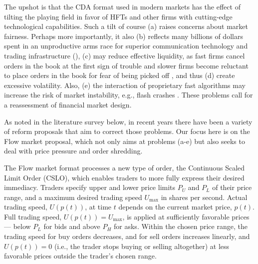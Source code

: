 The upshot is that the CDA format used in modern markets has the effect of tilting the playing field in favor of HFTs and other firms with cutting-edge technological capabilities. Such a tilt of course (a) raises concerns about market fairness. 
Perhaps more importantly, it also
(b) reflects many billions of dollars spent in an unproductive arms race for superior communication technology and trading infrastructure (\citealp{Budish2015}),
(c) may reduce effective liquidity, as fast firms cancel orders in the book at the first sign of trouble and slower firms become reluctant to place orders in the book for fear of being picked off \citep{Easly2012}, and thus
(d) create excessive volatility.
Also, (e) the interaction of proprietary fast algorithms may increase the risk of  market instability, e.g., flash crashes \citep{aldrich2017flash}.
These problems call for a reassessment of financial market design.

As noted in the literature survey below, in recent years there have been a variety of reform proposals that aim to correct those problems. 
Our focus here is on the Flow market proposal, which not only aims at problems (a-e) but also seeks to deal with price pressure and order shredding. %

The Flow market format processes a new type of order, the Continuous Scaled Limit Order (CSLO), which %
enables traders to more fully express their desired immediacy. 
Traders specify upper and lower price limits $P_U$ and $P_L$ of their price range, and a maximum desired trading speed $U_{\max}$ in shares per second. 
Actual 
trading speed, \(U(p(t))\), at time $t$ depends on the current market price, \(p(t)\). Full trading speed,
$U(p(t))=U_{\max}$, is applied at sufficiently favorable prices --- below \(P_L\) for bids and above \(P_H\) for asks. Within the chosen price range, the trading speed for buy orders decreases, and for sell orders increases linearly,
and $U(p(t))=0$ (i.e., the trader stops buying or selling altogether) at less favorable prices outside the trader's chosen range.


